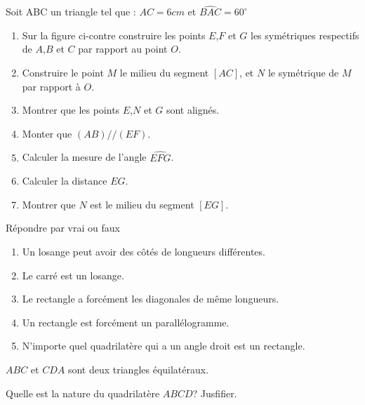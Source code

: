 \documentclass[a4paper,12pt]{article}
\begin{document}
\devoir[sem=2,prv=true,ds=false,num=5 ,niv=1 ,date=17/04/2023,Rdate=25/04/2023]

\begin{exo}
Soit ABC un triangle tel que : $AC=6cm$ et $\widehat{BAC}=60^{\circ}$
\begin{enumerate}
\item Sur la figure ci-contre construire les points $E$,$F$ et $G$ les symétriques respectifs de $A$,$B$ et $C$ par rapport au point $O$.
\item Construire le point $M$ le milieu du segment $[AC]$, et $N$ le symétrique de $M$ par rapport à $O$.
\item Montrer que les points $E$,$N$ et $G$ sont alignés.
\item Monter que $(AB)//(EF)$.
\item Calculer la mesure de l'angle $\widehat{EFG}$.
\item Calculer la distance $EG$.
\item Montrer que $N$ est le milieu du segment $[EG]$.
\end{enumerate}
\end{exo}

\begin{exo}
Répondre par vrai ou faux
\begin{enumerate}
\item Un losange peut avoir des côtés de longueurs différentes.
\item Le carré est un losange.
\item Le rectangle a forcément les diagonales de même longueurs.
\item Un rectangle est forcément un parallélogramme.
\item N'importe quel quadrilatère qui a un angle droit est un rectangle.
\end{enumerate}
\end{exo}

\begin{exo}
\begin{minipage}{.6\linewidth}
$ABC$ et $CDA$ sont deux triangles équilatéraux.

Quelle est la nature du quadrilatère $ABCD$? Jusfifier.
\end{minipage}
\begin{minipage}{.4\linewidth}
\end{minipage}

\end{exo}
\end{document}
